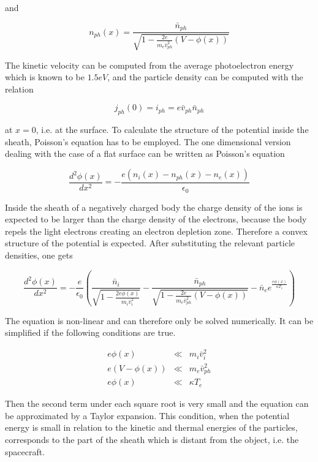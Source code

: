 \documentclass[a4paper,11pt]{thesis}
\begin{document}
and

\begin{equation}
    n_{ph}(x)=\frac{\bar{n}_{ph}}{\sqrt{1-\frac{2e}{m_e\bar{v}_{ph}^2}\left(V-\phi(x)\right)}}
\end{equation}

The kinetic velocity can be computed from the average photoelectron energy which is known to be $1.5eV$, and the particle density can be computed with the relation

\begin{equation}
j_{ph}(0) = i_{ph}=e \bar{v}_{ph} \bar{n}_{ph}
\end{equation}

at $x=0$, i.e. at the surface. To calculate the structure of the potential inside the sheath, Poisson's equation has to be employed. The one dimensional version dealing with the case of a flat surface can be written as Poisson's equation

\begin{equation}
    \frac{d^2 \phi(x)}{dx^2}=-\frac{e(n_i(x)-n_{ph}(x)-n_e(x))}{\epsilon_0}
\end{equation}

Inside the sheath of a negatively charged body the charge density of the ions is expected to be larger than the charge density of the electrons, because the body repels the light electrons creating an electron depletion zone. Therefore a convex structure of the potential is expected. After substituting the relevant particle densities, one gets

\begin{equation}
    \frac{d^2 \phi(x)}{dx^2}=-\frac{e}{\epsilon_0}\left(\frac{\bar{n}_i}{\sqrt{1-\frac{2e\phi(x)}{m_i\bar{v}_i^2}}}-
\frac{\bar{n}_{ph}}{\sqrt{1-\frac{2e}{m_e\bar{v}_{ph}^2}\left(V-\phi(x)\right)}}-\bar{n}_e e^{\frac{e\phi(x)}{\kappa T_e}}\right)
\end{equation}

The equation is non-linear and can therefore only be solved numerically. It can be simplified if the following conditions are true.

\begin{eqnarray}
  e\phi(x) &\ll& m_i\bar{v}_i^2 \\
 e(V-\phi(x)) &\ll& m_e\bar{v}_{ph}^2 \\
 e\phi(x) &\ll& \kappa T_e
 \end{eqnarray}

Then the second term under each square root is very small and the equation can be approximated by a Taylor expansion. This condition, when the potential energy is small in relation to the kinetic and thermal energies of the particles, corresponds to the part of the sheath which is distant from the object, i.e. the spacecraft.
\end{document}
